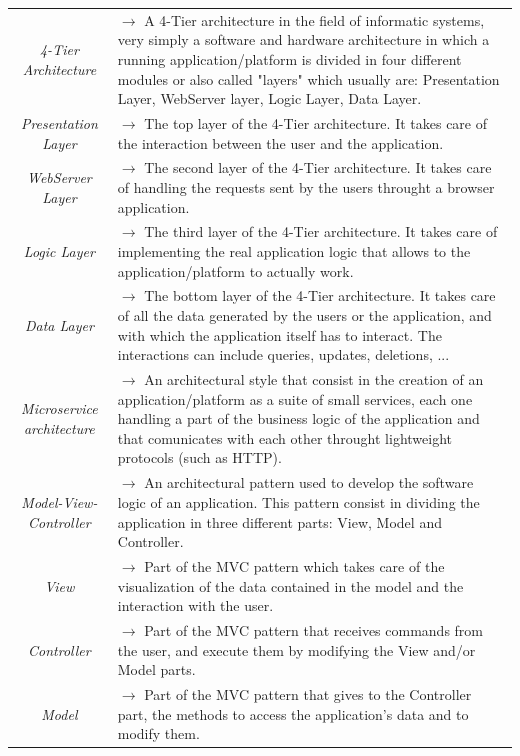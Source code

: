 \documentclass{article}
\begin{document}
{\begin{xltabular}{\textwidth}{ >{\raggedright\arraybackslash}c >{\raggedright\arraybackslash}X }
    \textit{4-Tier Architecture} & $\rightarrow$ A 4-Tier architecture in the field of informatic systems, very simply
    a software and hardware architecture in which a running application/platform is divided in four different modules
    or also called "layers" which usually are: Presentation Layer, WebServer layer, Logic Layer, Data Layer. \\
    \textit{Presentation Layer} & $\rightarrow$ The top layer of the 4-Tier architecture. It takes care of the interaction
    between the user and the application.\\
    \textit{WebServer Layer} & $\rightarrow$ The second layer of the 4-Tier architecture. It takes care of handling the requests
    sent by the users throught a browser application. \\
    \textit{Logic Layer} & $\rightarrow$ The third layer of the 4-Tier architecture. It takes care of implementing the real
    application logic that allows to the application/platform to actually work. \\
    \textit{Data Layer} & $\rightarrow$ The bottom layer of the 4-Tier architecture. It takes care of all the data generated
    by the users or the application, and with which the application itself has to interact. The interactions
    can include queries, updates, deletions, ... \\
    \textit{Microservice architecture} & $\rightarrow$ An architectural style that consist in the creation of an
    application/platform as a suite of small services, each one handling a part of the business logic of the application
    and that comunicates with each other throught lightweight protocols (such as HTTP). \\
    \textit{Model-View-Controller} & $\rightarrow$ An architectural pattern used to develop the
    software logic of an application. This pattern consist in dividing the application in three
    different parts: View, Model and Controller. \\
    \textit{View} & $\rightarrow$ Part of the MVC pattern which takes care of the visualization of the
    data contained in the model and the interaction with the user. \\
    \textit{Controller} & $\rightarrow$ Part of the MVC pattern that receives commands from the user, and execute them
    by modifying the View and/or Model parts. \\
    \textit{Model} & $\rightarrow$ Part of the MVC pattern that gives to the Controller part, the
    methods to access the application's data and to modify them.
\end{xltabular}

}
\end{document}
